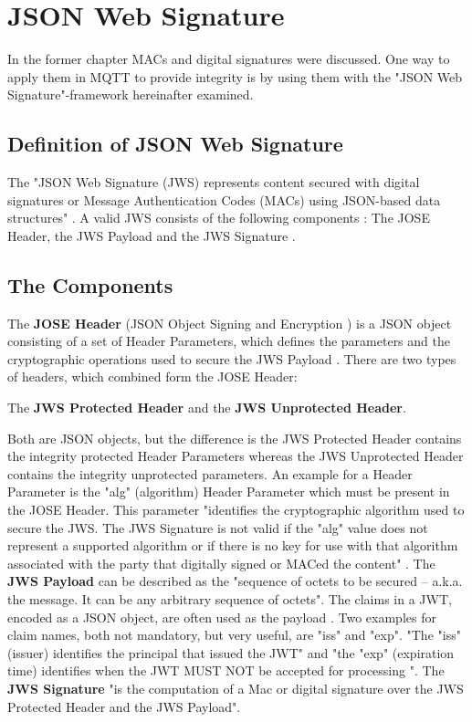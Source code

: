 \section{JSON Web Signature}

In the former chapter MACs and digital signatures were discussed. One way to apply them in MQTT to provide integrity is by using them with the "JSON Web Signature"-framework hereinafter examined. 

\subsection{Definition of JSON Web Signature}
The
"JSON Web Signature (JWS) represents content secured with digital signatures or Message Authentication Codes (MACs) using JSON-based  data structures" \cite{rfc7515}.
A valid JWS consists of the following components : The JOSE Header, the JWS Payload and the JWS Signature \cite{rfc7515}.\newline
\subsection{The Components}
The \textbf{JOSE Header} (JSON Object Signing and Encryption ) is a JSON object consisting of a set of Header Parameters, which defines the parameters and the cryptographic operations used to secure the JWS Payload \cite{rfc7515}. There are two types of headers, which combined form the JOSE Header: \begin{center} The \textbf{JWS Protected Header} and the \textbf{JWS Unprotected Header}.
\end{center}
Both are JSON objects, but the difference is the JWS Protected Header contains the integrity protected Header Parameters whereas the JWS Unprotected Header contains the integrity unprotected parameters.\newline
An example for a Header Parameter is the "alg" (algorithm) Header Parameter which must be present in the JOSE Header. This parameter "identifies the cryptographic algorithm used to secure the JWS. The JWS Signature is not valid if the "alg" value does not represent a supported algorithm or if there is no key for use with that algorithm associated with the party that digitally signed or MACed the content" \cite{rfc7515}.\newline \newline
The \textbf{JWS Payload} can be described as the "sequence of octets to be secured -- a.k.a. the message. It can be any arbitrary sequence of octets"\cite{rfc7515}.\newline
The claims in a JWT, encoded as a JSON object, are often used as the payload \cite{rfc7519}.\newline
Two examples for claim names, both not mandatory, but very useful, are "iss" and "exp". "The "iss" (issuer) identifies the principal that issued the JWT" \cite{rfc7519} and "the "exp" (expiration time) identifies when the JWT MUST NOT be accepted for processing "\cite{rfc7519}. \newline \newline
The \textbf{JWS Signature} "is the computation of a Mac or digital signature over the JWS Protected Header and the JWS Payload"\cite{rfc7515}.\newline 
